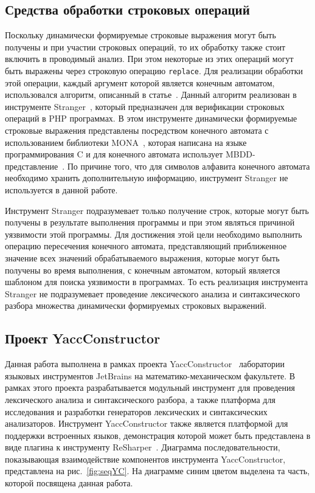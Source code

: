 \documentclass{matmex-diploma}
\begin{document}
\subsection{Средства обработки строковых операций}

Поскольку динамически формируемые строковые выражения могут быть получены и при участии строковых операций, то их обработку также стоит включить в проводимый анализ. При этом некоторые из этих операций могут быть выражены через строковую операцию \verb|replace|. Для реализации обработки этой операции, каждый аргумент которой является конечным автоматом, использовался алгоритм, описанный в статье~\cite{ReplaceFangYu}. Данный алгоритм реализован в инструменте Stranger~\cite{StrangerFangYu}, который предназначен для верификации строковых операций в PHP программах. В этом инструменте динамически формируемые строковые выражения представлены посредством конечного автомата с использованием библиотеки MONA~\cite{MONAUrl}, которая написана на языке программирования C и для конечного автомата использует MBDD-представление~\cite{MBDD}. По причине того, что для символов алфавита конечного автомата необходимо хранить дополнительную информацию, инструмент Stranger не используется в данной работе.

Инструмент Stranger подразумевает только получение строк, которые могут быть получены в результате выполнения программы и при этом являться причиной уязвимости этой программы. Для достижения этой цели необходимо выполнить операцию пересечения конечного автомата, представляющий приближенное значение всех значений обрабатываемого выражения, которые могут быть получены во время выполнения, с конечным автоматом, который является шаблоном для поиска уязвимости в программах. То есть реализация инструмента Stranger не подразумевает проведение лексического анализа и синтаксического разбора множества динамически формируемых строковых выражений.

\subsection{Проект YaccConstructor}

Данная работа выполнена в рамках проекта YaccConstructor~\cite{YCUrl} лаборатории языковых инструментов JetBrains на математико-механическом факультете. В рамках этого проекта разрабатывается модульный инструмент для проведения лексического анализа и синтаксического разбора, а также платформа для исследования и разработки генераторов лексических и синтаксических анализаторов. Инструмент YaccConstructor также является платформой для поддержки встроенных языков, демонстрация которой может быть представлена в виде плагина к инструменту ReSharper~\cite{ReSharper}. Диаграмма последовательности, показывающая взаимодействие компонентов инструмента YaccConstructor, представлена на рис.~\ref{fig:seqYC}. На диаграмме синим цветом выделена та часть, которой посвящена данная работа. 
\end{document}
